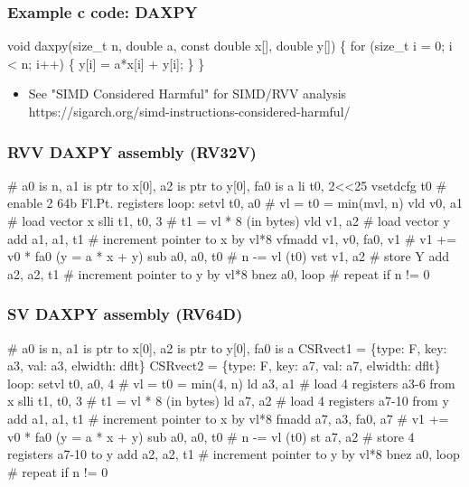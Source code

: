 \documentclass[slidestop]{beamer}
\begin{document}
\begin{frame}[fragile]
\frametitle{Example c code: DAXPY}

\begin{semiverbatim}
    void daxpy(size_t n, double a,
               const double x[], double y[])
    \{
     for (size_t i = 0; i < n; i++) \{
       y[i] = a*x[i] + y[i];
     \}
    \}
\end{semiverbatim}

  \begin{itemize}
   \item See "SIMD Considered Harmful" for SIMD/RVV analysis\\
	   https://sigarch.org/simd-instructions-considered-harmful/
  \end{itemize}


\end{frame}


\begin{frame}[fragile]
\frametitle{RVV DAXPY assembly (RV32V)}

\begin{semiverbatim}
# a0 is n, a1 is ptr to x[0], a2 is ptr to y[0], fa0 is a
 li t0, 2<<25
 vsetdcfg t0            # enable 2 64b Fl.Pt. registers
loop:
 setvl  t0, a0          # vl = t0 = min(mvl, n)
 vld    v0, a1          # load vector x
 slli   t1, t0, 3       # t1 = vl * 8 (in bytes)
 vld    v1, a2          # load vector y
 add    a1, a1, t1      # increment pointer to x by vl*8
 vfmadd v1, v0, fa0, v1 # v1 += v0 * fa0 (y = a * x + y)
 sub    a0, a0, t0      # n -= vl (t0)
 vst    v1, a2          # store Y
 add    a2, a2, t1      # increment pointer to y by vl*8
 bnez   a0, loop        # repeat if n != 0
\end{semiverbatim}
\end{frame}


\begin{frame}[fragile]
\frametitle{SV DAXPY assembly (RV64D)}

\begin{semiverbatim}
# a0 is n, a1 is ptr to x[0], a2 is ptr to y[0], fa0 is a
 CSRvect1 = \{type: F, key: a3, val: a3, elwidth: dflt\}
 CSRvect2 = \{type: F, key: a7, val: a7, elwidth: dflt\}
loop:
 setvl  t0, a0, 4       # vl = t0 = min(4, n)
 ld     a3, a1          # load 4 registers a3-6 from x
 slli   t1, t0, 3       # t1 = vl * 8 (in bytes)
 ld     a7, a2          # load 4 registers a7-10 from y
 add    a1, a1, t1      # increment pointer to x by vl*8
 fmadd  a7, a3, fa0, a7 # v1 += v0 * fa0 (y = a * x + y)
 sub    a0, a0, t0      # n -= vl (t0)
 st     a7, a2          # store 4 registers a7-10 to y
 add    a2, a2, t1      # increment pointer to y by vl*8
 bnez   a0, loop        # repeat if n != 0
\end{semiverbatim}
\end{frame}
\end{document}
